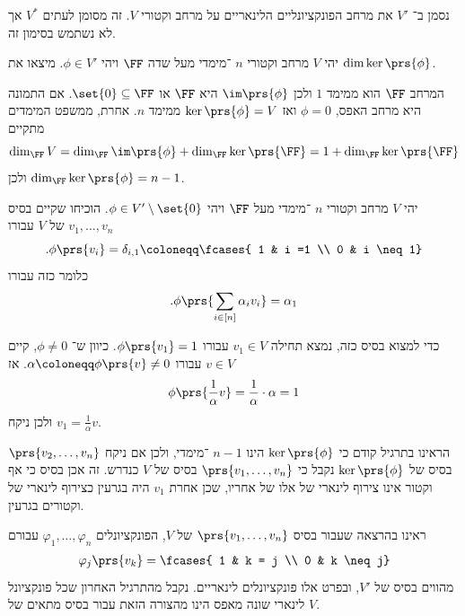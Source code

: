 \documentclass[a4paper,10pt,twoside,openany]{book}
\begin{document}
\begin{notation}
נסמן ב־%
$V'$
את מרחב הפונקציונליים הלינאריים על מרחב וקטורי
$V$.
זה מסומן לעתים
$V^*$
אך לא נשתמש בסימון זה.
\end{notation}

\begin{exercisechap}
יהי
$V$
מרחב וקטורי
$n$%
־מימדי מעל שדה
$\FF$
ויהי
$\phi \in V'$.
מיצאו את
$\dim \ker\prs{\phi}$.
\end{exercisechap}

\begin{solution}
המרחב
$\FF$
הוא ממימד
$1$
ולכן
$\im\prs{\phi}$
היא
$\FF$
או
$\set{0} \subseteq \FF$.
אם התמונה היא מרחב האפס,
$\phi = 0$
ואז
$\ker\prs{\phi} = V$
ממימד
$n$.
אחרת, ממשפט המימדים מתקיים
\[\dim_\FF V = \dim_\FF \im\prs{\phi} + \dim_\FF \ker\prs{\FF} = 1 + \dim_\FF \ker\prs{\FF}\]
ולכן
$\dim_\FF \ker\prs{\phi} = n - 1$.
\end{solution}

\begin{exercisechap}
יהי
$V$
מרחב וקטורי
$n$%
־מימדי מעל
$\FF$
ויהי
$\phi \in V' \setminus \set{0}$.
הוכיחו שקיים בסיס
$v_1, \ldots, v_n$
של
$V$
עבורו
\[\text{.} \phi\prs{v_i} = \delta_{i,1} \coloneqq \fcases{ 1 & i =1 \\ 0 & i \neq 1}\]
כלומר כזה עבורו
\begin{align*}
\text{.} \phi\prs{\sum_{i \in [n]} \alpha_i v_i} = \alpha_1
\end{align*}
\end{exercisechap}

\begin{solution}
כדי למצוא בסיס כזה, נמצא תחילה
$v_1 \in V$
עבורו
$\phi\prs{v_1} = 1$.
כיוון ש־%
$\phi \neq 0$,
קיים
$v \in V$
עבורו
$\alpha \coloneqq \phi\prs{v} \neq 0$.
אז
\[\phi\prs{\frac{1}{\alpha} v} = \frac{1}{\alpha} \cdot \alpha = 1\]
ולכן ניקח
$v_1 = \frac{1}{\alpha} v$.

הראינו בתרגיל קודם כי
$\ker\prs{\phi}$
הינו
$n-1$%
־מימדי, ולכן אם ניקח
$\prs{v_2, \ldots, v_n}$
בסיס של
$\ker\prs{\phi}$
נקבל כי
$\prs{v_1, \ldots, v_n}$
בסיס של
$V$
כנדרש. זה אכן בסיס כי אף וקטור אינו צירוף לינארי של אלו של אחריו, שכן אחרת
$v_1$
היה בגרעין כצירוף לינארי של וקטורים בגרעין.
\end{solution}

ראינו בהרצאה שעבור בסיס
$\prs{v_1, \ldots, v_n}$
של
$V$,
הפונקציונלים
$\varphi_1, \ldots, \varphi_n$
עבורם
\begin{align*}
\varphi_j\prs{v_k} = \fcases{ 1 & k = j \\ 0 & k \neq j}
\end{align*}
מהווים בסיס של
$V'$,
ובפרט אלו פונקציונלים לינאריים. נקבל מהתרגיל האחרון שכל פונקציונל לינארי שונה מאפס הינו מהצורה הזאת עבור בסיס מתאים של
$V$.
\end{document}
